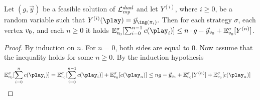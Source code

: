 \begin{lemma}
\label{5-lem:dual-bound-step}
Let $({g}, \vec{y})$ be a feasible solution of $\mathcal{L}_{\mathit{mp}}^{\mathit{dual}}$ and let $Y^{(i)}$, where $i\geq 0$, be a random variable such that $Y^{(i)}(\play)= \vec{y}_{\ing(\pi_i)}.$ Then for each strategy $\sigma$, each vertex $v_0$, and each $n\geq 0$ it holds $\expv^\sigma_{\vinit}[\sum_{i=0}^{n-1}\colouring(\play_i)]\leq n\cdot {g}- \vec{y}_{\vinit} +\expv^\sigma_{\vinit} [Y^{(n)}]$.	
\end{lemma}
\begin{proof}
By induction on $n$. For $n=0$, both sides are equal to 0. Now assume that the inequality holds for some $n\geq 0$. By the induction hypothesis
\begin{align}
\expv^\sigma_{\vinit}[\sum_{i=0}^{n}\colouring(\play_i)] &= \expv^\sigma_{\vinit}[\sum_{i=0}^{n-1}\colouring(\play_i)] + \expv^\sigma_{\vinit}[\colouring(\play_n)] \leq n{g}- \vec{y}_{\vinit} +\expv^\sigma_{\vinit} [Y^{(n)}] + \expv^\sigma_{\vinit}[\colouring(\play_n)] \label{5-eq:mpdual-1}
\end{align}


\end{proof}

